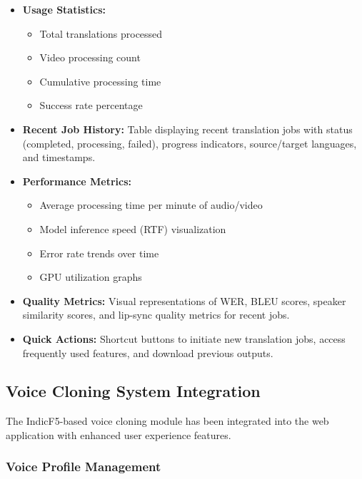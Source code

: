 \documentclass[12pt,oneside]{report}
\begin{document}
\begin{itemize}
    \item \textbf{Usage Statistics:}
    \begin{itemize}
        \item Total translations processed
        \item Video processing count
        \item Cumulative processing time
        \item Success rate percentage
    \end{itemize}
    
    \item \textbf{Recent Job History:} Table displaying recent translation jobs with status (completed, processing, failed), progress indicators, source/target languages, and timestamps.
    
    \item \textbf{Performance Metrics:}
    \begin{itemize}
        \item Average processing time per minute of audio/video
        \item Model inference speed (RTF) visualization
        \item Error rate trends over time
        \item GPU utilization graphs
    \end{itemize}
    
    \item \textbf{Quality Metrics:} Visual representations of WER, BLEU scores, speaker similarity scores, and lip-sync quality metrics for recent jobs.
    
    \item \textbf{Quick Actions:} Shortcut buttons to initiate new translation jobs, access frequently used features, and download previous outputs.
\end{itemize}

\subsection{Voice Cloning System Integration}

The IndicF5-based voice cloning module has been integrated into the web application with enhanced user experience features.

\subsubsection{Voice Profile Management}
\end{document}
